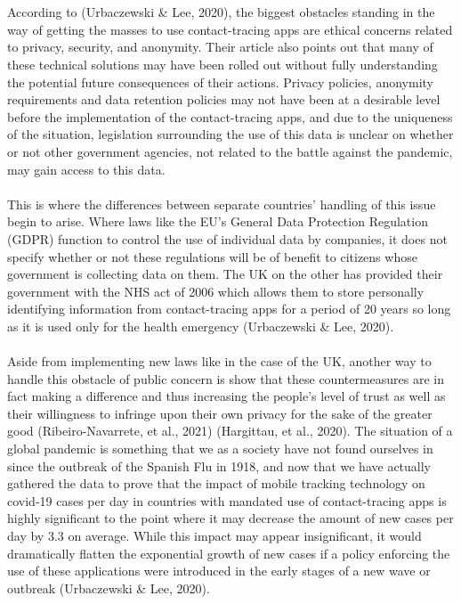\documentclass[11pt]{article}
\begin{document}
\\ \\
According to (Urbaczewski \& Lee, 2020), the biggest obstacles standing in the way of getting the masses to use contact-tracing apps are ethical concerns related to privacy, security, and anonymity. Their article also points out that many of these technical solutions may have been rolled out without fully understanding the potential future consequences of their actions. Privacy policies, anonymity requirements and data retention policies may not have been at a desirable level before the implementation of the contact-tracing apps, and due to the uniqueness of the situation, legislation surrounding the use of this data is unclear on whether or not other government agencies, not related to the battle against the pandemic, may gain access to this data. 
\\ \\
This is where the differences between separate countries’ handling of this issue begin to arise. Where laws like the EU’s General Data Protection Regulation (GDPR) function to control the use of individual data by companies, it does not specify whether or not these regulations will be of benefit to citizens whose government is collecting data on them. The UK on the other has provided their government with the NHS act of 2006 which allows them to store personally identifying information from contact-tracing apps for a period of 20 years so long as it is used only for the health emergency (Urbaczewski \& Lee, 2020).
\\ \\
Aside from implementing new laws like in the case of the UK, another way to handle this obstacle of public concern is show that these countermeasures are in fact making a difference and thus increasing the people’s level of trust as well as their willingness to infringe upon their own privacy for the sake of the greater good (Ribeiro-Navarrete, et al., 2021) (Hargittau, et al., 2020). The situation of a global pandemic is something that we as a society have not found ourselves in since the outbreak of the Spanish Flu in 1918, and now that we have actually gathered the data to prove that the impact of mobile tracking technology on covid-19 cases per day in countries with mandated use of contact-tracing apps is highly significant to the point where it may decrease the amount of new cases per day by 3.3 on average. While this impact may appear insignificant, it would dramatically flatten the exponential growth of new cases if a policy enforcing the use of these applications were introduced in the early stages of a new wave or outbreak (Urbaczewski \& Lee, 2020).
\end{document}
